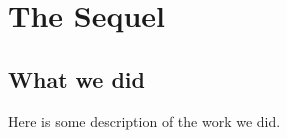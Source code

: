 \chapter{The Sequel}
\label{c.Sequel}
\section{What we did}
\label{s.Work}
Here is some description of the work we did.\\
